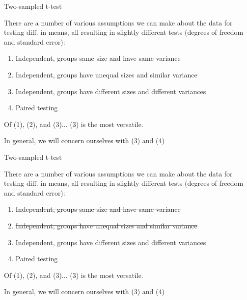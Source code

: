 \documentclass{beamer}
\begin{document}
\begin{frame}{Two-sampled t-test}

There are a number of various assumptions we can make about the data for testing diff. in means, all resulting in slightly different tests (degrees of freedom and standard error): \vspace{5mm}

\begin{enumerate}
\item Independent, groups same size and have same variance
\item Independent, groups have unequal sizes and similar variance
\item Independent, groups have different sizes and different variances
\item Paired testing
\end{enumerate}

\vspace{5mm}

Of (1), (2), and (3)... (3) is the most versatile. \vspace{2mm}

In general, we will concern ourselves with (3) and (4)

\end{frame}

\begin{frame}{Two-sampled t-test}

There are a number of various assumptions we can make about the data for testing diff. in means, all resulting in slightly different tests (degrees of freedom and standard error): \vspace{5mm}

\begin{enumerate}
\item \st{Independent, groups same size and have same variance}
\item \st{Independent, groups have unequal sizes and similar variance}
\item Independent, groups have different sizes and different variances
\item Paired testing
\end{enumerate}

\vspace{5mm}

Of (1), (2), and (3)... (3) is the most versatile. \vspace{2mm}

In general, we will concern ourselves with (3) and (4)

\end{frame}
\end{document}
